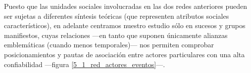 \documentclass[letterpaper, 11pt]{book}
\theoremstyle{definition}
\theoremstyle{remark}
\begin{document}








Puesto que las unidades sociales involucradas en las dos redes anteriores pueden ser sujetas a diferentes síntesis teóricas (que representen atributos sociales característicos), en adelante centramos nuestro estudio sólo en sucesos y grupos manifiestos, cuyas relaciones ---en tanto que suponen únicamente alianzas emblemáticas (cuando menos temporales)--- nos permiten comprobar posicionamientos y pautas de asociación entre actores particulares con una alta confiabilidad ---figura \ref{5_1_red_actores_eventos}---. 
\end{document}
